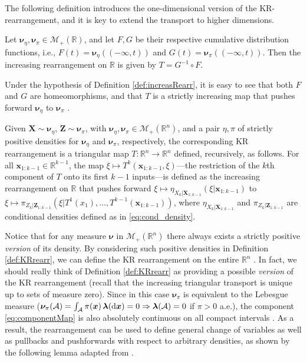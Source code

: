 \documentclass[twoside,11pt]{article}
\newcommand{\borelm}{\mathscr{M}}
\newcommand{\borelmp}{\borelm_+}
\newcommand{\lebm}{\boldsymbol{\lambda} } %
\newcommand{\genm}{\boldsymbol{\nu} }   %
\newcommand{\re}{\mathbb{R}}
\newcommand{\ra}{\rightarrow}
\newcommand{\Ac}{\mathcal{A}}
\newcommand{\Xb}{\boldsymbol{X}}
\newcommand{\xb}{\boldsymbol{x}}
\newcommand{\Zb}{\boldsymbol{Z}}
\newcommand{\Aset}{ \Ac }
\begin{document}
The following definition introduces the one-dimensional version of the KR-rearrangement, and it
is key to extend the transport to higher dimensions.
%
\begin{definition}[Increasing rearrangement on $\re$]
\label{def:increasRearr}
Let $\genm_\eta,\genm_\pi \in \borelmp(\re)$, and let $F,G$ be their respective cumulative distribution functions, i.e., 
$F(t)=\genm_\eta( (-\infty, t) )$ and
$G(t)=\genm_\pi( (-\infty, t) )$.
%
%
Then 
the increasing rearrangement on $\re$ is given by $T=G^{-1} \circ F$.
%
%
%
%
%
\end{definition}
%
Under the hypothesis of Definition \ref{def:increasRearr}, it is easy to see that
both $F$ and $G$ are homeomorphisms, and that $T$ is a strictly increasing
map that pushes forward $\genm_\eta$ to $\genm_\pi$ \citep{santambrogio2015optimal}.
%
%
%
%
%
%
\begin{definition}
\label{def:KRrearr}
%
%
%
%
%
%
%
%
%
%
%
%
%
%
%
Given 
$\Xb \sim \genm_\eta$, $\Zb \sim \genm_\pi$, with 
$\genm_\eta,\genm_\pi \in \borelmp(\re^n)$, and 
a pair $\eta,\pi$ of strictly positive densities for 
$\genm_\eta$ and $\genm_\pi$, respectively,
%
the corresponding KR rearrangement
%
%
%
is a triangular map $T:\re^n \ra \re^n$ defined,
recursively, as follows. %
%
For all $\xb_{1:k-1}\in \re^{k-1}$, the map 
$\xi \mapsto T^k(\xb_{1:k-1}, \xi )$---the restriction of 
%
the $k$th component of $T$
onto its first $k-1$ 
inputs---is
defined as the   increasing rearrangement on $\re$
%
that 
pushes forward $\xi \mapsto \eta_{X_k \vert \Xb_{1:k-1}}( \xi \vert \xb_{1:k-1})$ to
$\xi \mapsto \pi_{Z_k\vert \Zb_{1:k-1}}( \xi \vert T^1(x_1), \ldots, T^{k-1}(\xb_{1:k-1}) )$, where
$\eta_{X_k \vert \Xb_{1:k-1}}$ and $\pi_{Z_k\vert \Zb_{1:k-1}}$ 
are conditional densities defined as in \eqref{eq:cond_density}.
%
\end{definition}
%
Notice that for any measure $\genm$ in $\borelmp(\re^n)$ there always
exists a strictly positive {\it version} of its density.
By considering such positive densities in Definition \ref{def:KRrearr}, we can
define the KR rearrangement on the entire $\re^n$ \citep{bogachev2005triangular}.
In fact, we should really think of Definition \ref{def:KRrearr} as providing
a possible {\it version} of the KR rearrangement 
(recall that the increasing triangular
transport is unique up to sets of measure zero).
%
%
Since in this case $\genm_\pi$ is equivalent to the
Lebesgue measure 
($\genm_\pi(\Aset)=\int_{\Aset} \pi(\xb)\,\lebm({\rm d}\xb) = 0 
\Rightarrow \lebm(\Aset)=0$ if $\pi>0$ a.e.), 
the component \eqref{eq:componentMap}
is also absolutely continuous on all compact intervals 
\citep[Lemma 2.4]{bogachev2005triangular}.
As a result, the rearrangement can be used to
%
%
%
define general change of variables 
as well as
pullbacks and pushforwards with respect to arbitrary densities, as shown
by the following lemma
adapted from \citet{bogachev2005triangular}. %
%
%
%
%
%
%
%
\end{document}
